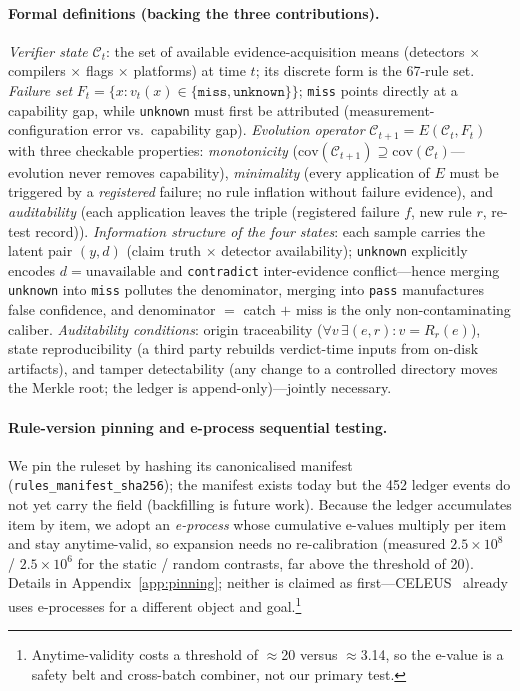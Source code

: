 \documentclass{article}
\begin{document}
\paragraph{Formal definitions (backing the three contributions).}
\emph{Verifier state} $\mathcal{C}_t$: the set of available evidence-acquisition means (detectors
$\times$ compilers $\times$ flags $\times$ platforms) at time $t$; its discrete form is the
67-rule set. \emph{Failure set} $F_t = \{x : v_t(x) \in \{\texttt{miss}, \texttt{unknown}\}\}$;
\texttt{miss} points directly at a capability gap, while \texttt{unknown} must first be attributed
(measurement-configuration error vs.\ capability gap). \emph{Evolution operator}
$\mathcal{C}_{t+1} = E(\mathcal{C}_t, F_t)$ with three checkable properties:
\emph{monotonicity} ($\mathrm{cov}(\mathcal{C}_{t+1}) \supseteq \mathrm{cov}(\mathcal{C}_t)$---
evolution never removes capability), \emph{minimality} (every application of $E$ must be triggered
by a \emph{registered} failure; no rule inflation without failure evidence), and
\emph{auditability} (each application leaves the triple (registered failure $f$, new rule $r$,
re-test record)). \emph{Information structure of the four states}: each sample carries the latent pair $(y, d)$
(claim truth $\times$ detector availability); \texttt{unknown} explicitly encodes
$d{=}\text{unavailable}$ and \texttt{contradict} inter-evidence conflict---hence merging
\texttt{unknown} into \texttt{miss} pollutes the denominator, merging into \texttt{pass}
manufactures false confidence, and denominator $=$ catch $+$ miss is the only non-contaminating
caliber. \emph{Auditability conditions}: origin traceability ($\forall v\, \exists (e,r): v = R_r(e)$),
state reproducibility (a third party rebuilds verdict-time inputs from on-disk artifacts), and
tamper detectability (any change to a controlled directory moves the Merkle root; the ledger is
append-only)---jointly necessary.

\paragraph{Rule-version pinning and e-process sequential testing.} We pin the ruleset by hashing
its canonicalised manifest (\texttt{rules\_manifest\_sha256}); the manifest exists today but the 452
ledger events do not yet carry the field (backfilling is future work). Because the ledger accumulates
item by item, we adopt an \emph{e-process} whose cumulative e-values multiply per item and stay
anytime-valid, so expansion needs no re-calibration (measured $2.5\times10^8$ / $2.5\times10^6$ for
the static / random contrasts, far above the threshold of 20). Details in Appendix~\ref{app:pinning};
neither is claimed as first---CELEUS~\cite{zhou2026celeus} already uses e-processes for a different
object and goal.\footnote{Anytime-validity costs a threshold of $\approx$20 versus $\approx$3.14, so
the e-value is a safety belt and cross-batch combiner, not our primary test.}
\end{document}
